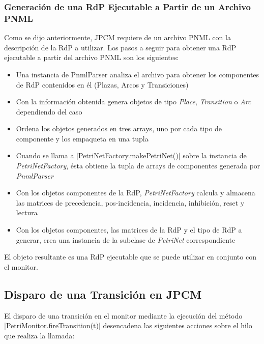 \subsubsection{Generación de una RdP Ejecutable a Partir de un Archivo PNML}
Como se dijo anteriormente, JPCM requiere de un archivo PNML con la descripción
de la RdP a utilizar. Los pasos a seguir para obtener una RdP ejecutable a
partir del archivo PNML son los siguientes:
\begin{itemize}
  \item Una instancia de PnmlParser analiza el archivo para obtener los
  componentes de RdP contenidos en él (Plazas, Arcos y Transiciones)
  \item Con la información obtenida genera objetos de tipo \textit{Place},
  \textit{Transition} o \textit{Arc} dependiendo del caso
  \item Ordena los objetos generados en tres arrays, uno por cada tipo de
  componente y los empaqueta en una tupla
  \item Cuando se llama a |PetriNetFactory.makePetriNet()| sobre la
  instancia de \textit{PetriNetFactory}, ésta obtiene la tupla de arrays de
  componentes generada por \textit{PnmlParser}
  \item Con los objetos componentes de la RdP, \textit{PetriNetFactory} calcula
  y almacena las matrices de precedencia, pos-incidencia, incidencia, inhibición,
  reset y lectura
  \item Con los objetos componentes, las matrices de la RdP y el tipo de RdP a
  generar, crea una instancia de la subclase de \textit{PetriNet}
  correspondiente
\end{itemize}

El objeto resultante es una RdP ejecutable que se puede utilizar en conjunto
con el monitor.

\subsection{Disparo de una Transición en JPCM}
El disparo de una transición en el monitor mediante la ejecución del método
|PetriMonitor.fireTransition(t)| desencadena las siguientes acciones
sobre el hilo que realiza la llamada:

